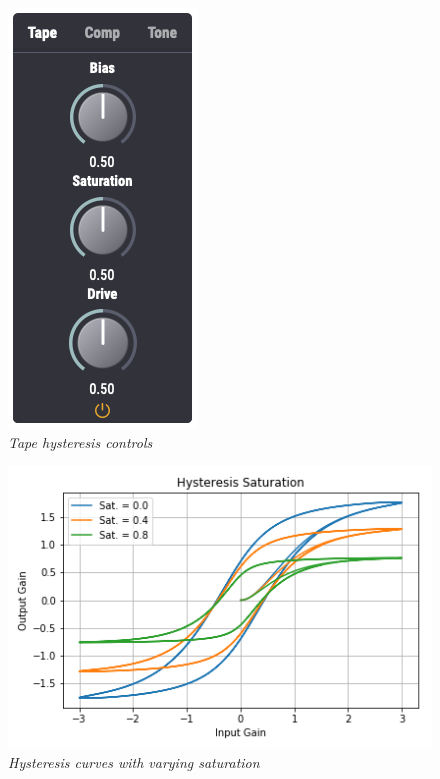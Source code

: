 \documentclass[landscape,twocolumn,a5paper]{manual}
\begin{document}
\begin{figure}[ht]
    \center
    \includegraphics[height=0.35\paperheight]{../Plugin/Screenshots/Tape.png}
    \caption{\label{hysteresis_controls}{\it Tape hysteresis controls}}
\end{figure}
%
%
\begin{figure}[ht]
    \center
    \includegraphics[width=0.85\columnwidth]{../Simulations/Hysteresis/sat.png}
    \caption{\label{h_sat}{\it Hysteresis curves with varying saturation}}
\end{figure}
%
\end{document}
